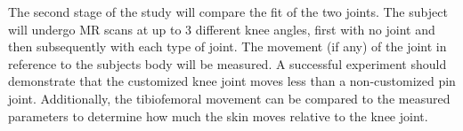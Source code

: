 The second stage of the study will compare the fit of the two joints. The subject will undergo MR scans at up to 3 different knee angles, first with no joint and then subsequently with each type of joint. The movement (if any) of the joint in reference to the subjects body will be measured. A successful experiment should demonstrate that the customized knee joint moves less than a non-customized pin joint. Additionally, the tibiofemoral movement can be compared to the measured parameters to determine how much the skin moves relative to the knee joint.
